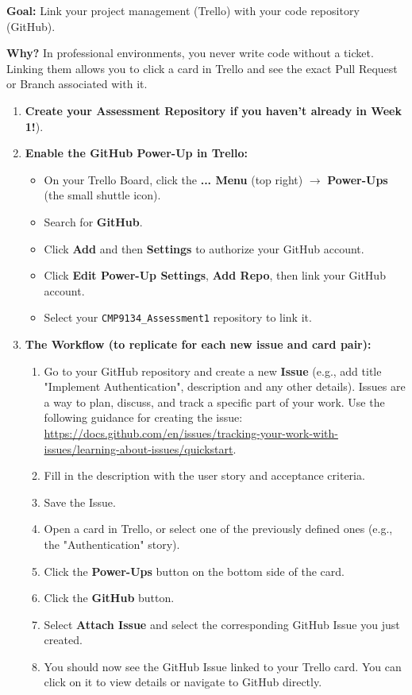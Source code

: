 \documentclass[a4paper,12pt]{article}
\begin{document}
\textbf{Goal:} Link your project management (Trello) with your code repository (GitHub).

\noindent \textbf{Why?} In professional environments, you never write code without a ticket. Linking them allows you to click a card in Trello and see the exact Pull Request or Branch associated with it.

\begin{enumerate}
    \item \textbf{Create your Assessment Repository if you haven't already in Week 1!}).
    \item \textbf{Enable the GitHub Power-Up in Trello:}
    \begin{itemize}
        \item On your Trello Board, click the \textbf{... Menu} (top right) $\rightarrow$ \textbf{Power-Ups} (the small shuttle icon).
        \item Search for \textbf{GitHub}.
        \item Click \textbf{Add} and then \textbf{Settings} to authorize your GitHub account.
        \item Click \textbf{Edit Power-Up Settings}, \textbf{Add Repo}, then link your GitHub account. 
        \item Select your \texttt{CMP9134\_Assessment1} repository to link it.
    \end{itemize}

    \item \textbf{The Workflow (to replicate for each new issue and card pair):}
    \begin{enumerate}
        \item Go to your GitHub repository and create a new \textbf{Issue} (e.g., add title "Implement Authentication", description and any other details). Issues are a way to plan, discuss, and track a specific part of your work. Use the following guidance for creating the issue: \url{https://docs.github.com/en/issues/tracking-your-work-with-issues/learning-about-issues/quickstart}.
        \item Fill in the description with the user story and acceptance criteria.
        \item Save the Issue.
        \item Open a card in Trello, or select one of the previously defined ones (e.g., the "Authentication" story).
        \item Click the \textbf{Power-Ups} button on the bottom side of the card.
        \item Click the \textbf{GitHub} button.
        \item Select \textbf{Attach Issue} and select the corresponding GitHub Issue you just created.
        \item You should now see the GitHub Issue linked to your Trello card. You can click on it to view details or navigate to GitHub directly.
    \end{enumerate}
    

\end{enumerate}
\end{document}
